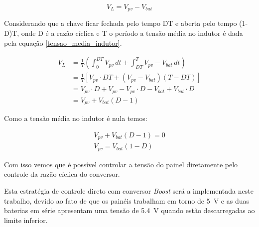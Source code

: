 \begin{equation} \label{tensao_indutor_segunda_etapa}
V_{L} = V_{pv} - V_{bat}
\end{equation}

Considerando que a chave ficar fechada pelo tempo DT e aberta pelo tempo (1-D)T, onde D é a razão cíclica e T o período a tensão média no indutor é dada pela equação \ref{tensao_media_indutor}.

\begin{equation} \label{tensao_media_indutor}
\begin{aligned}
V_{L} &= \frac{1}{T}\left(\int_{0}^{DT} V_{pv}\,dt + \int_{DT}^{T} V_{pv} - V_{bat}\,dt\right) \\
&= \frac{1}{T}\left[V_{pv}\cdot DT + (V_{pv}-V_{bat})(T-DT)\right] \\
&= V_{pv}\cdot D + V_{pv} - V_{pv}\cdot D - V_{bat} +V_{bat}\cdot D \\
&= V_{pv} + V_{bat}(D-1)
\end{aligned}
\end{equation}

Como a tensão média no indutor é nula temos:

\begin{equation}
\begin{gathered}
V_{pv} + V_{bat}(D-1) = 0 \\
V_{pv} = V_{bat}(1-D) 
\end{gathered}
\end{equation}

Com isso vemos que é possível controlar a tensão do painel diretamente pelo controle da razão cíclica do conversor.

Esta estratégia de controle direto com conversor \textit{Boost} será a implementada neste trabalho, devido ao fato de que os painéis trabalham em torno de \SI{5}{\volt} e as duas baterias em série apresentam uma tensão de \SI{5.4}{\volt} quando estão descarregadas ao limite inferior.